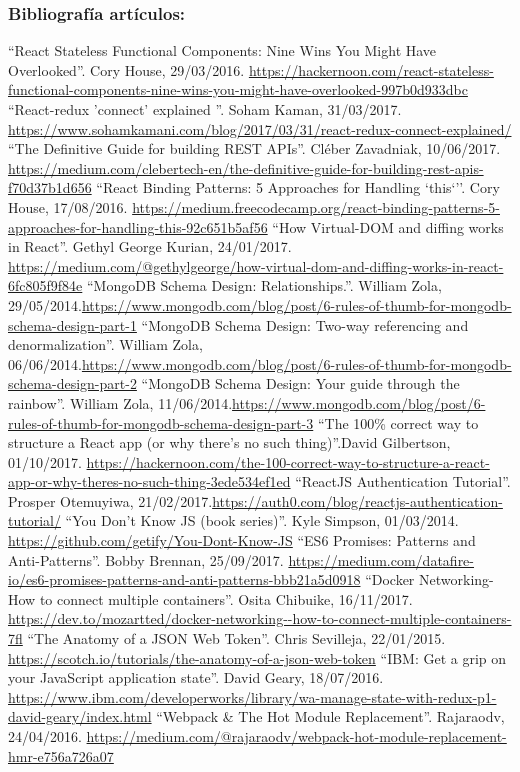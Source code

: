 
\subsubsection*{Bibliografía artículos:}

\bibitem{} ``React Stateless Functional Components: Nine Wins You Might Have Overlooked''. Cory House, 29/03/2016. \url{https://hackernoon.com/react-stateless-functional-components-nine-wins-you-might-have-overlooked-997b0d933dbc}
\bibitem{} ``React-redux 'connect' explained ''. Soham Kaman, 31/03/2017. \url{https://www.sohamkamani.com/blog/2017/03/31/react-redux-connect-explained/}
\bibitem{} ``The Definitive Guide for building REST APIs''. Cléber Zavadniak, 10/06/2017. \url{https://medium.com/clebertech-en/the-definitive-guide-for-building-rest-apis-f70d37b1d656}
\bibitem{} ``React Binding Patterns: 5 Approaches for Handling `this`''. Cory House, 17/08/2016. \url{https://medium.freecodecamp.org/react-binding-patterns-5-approaches-for-handling-this-92c651b5af56}
\bibitem{} ``How Virtual-DOM and diffing works in React''. Gethyl George Kurian, 24/01/2017. \url{https://medium.com/@gethylgeorge/how-virtual-dom-and-diffing-works-in-react-6fc805f9f84e}
\bibitem{} ``MongoDB Schema Design: Relationships.''. 	William Zola, 29/05/2014.\url{https://www.mongodb.com/blog/post/6-rules-of-thumb-for-mongodb-schema-design-part-1}
\bibitem{} ``MongoDB Schema Design: Two-way referencing and denormalization''. William Zola, 06/06/2014.\url{https://www.mongodb.com/blog/post/6-rules-of-thumb-for-mongodb-schema-design-part-2}
\bibitem{} ``MongoDB Schema Design: Your guide through the rainbow''. William Zola, 11/06/2014.\url{https://www.mongodb.com/blog/post/6-rules-of-thumb-for-mongodb-schema-design-part-3}
\bibitem{} ``The 100\% correct way to structure a React app (or why there’s no such thing)''.David Gilbertson, 01/10/2017. \url{https://hackernoon.com/the-100-correct-way-to-structure-a-react-app-or-why-theres-no-such-thing-3ede534ef1ed}
\bibitem{} ``ReactJS Authentication Tutorial''. Prosper Otemuyiwa, 21/02/2017.\url{https://auth0.com/blog/reactjs-authentication-tutorial/}
\bibitem{} ``You Don't Know JS (book series)''. Kyle Simpson, 01/03/2014. \url{https://github.com/getify/You-Dont-Know-JS}
\bibitem{} ``ES6 Promises: Patterns and Anti-Patterns''. Bobby Brennan, 25/09/2017. \url{https://medium.com/datafire-io/es6-promises-patterns-and-anti-patterns-bbb21a5d0918}
\bibitem{} ``Docker Networking- How to connect multiple containers''. Osita Chibuike, 16/11/2017. \url{https://dev.to/mozartted/docker-networking--how-to-connect-multiple-containers-7fl}
\bibitem{} ``The Anatomy of a JSON Web Token''. Chris Sevilleja, 22/01/2015. \url{https://scotch.io/tutorials/the-anatomy-of-a-json-web-token}
\bibitem{} ``IBM: Get a grip on your JavaScript application state''. David Geary, 18/07/2016. \url{https://www.ibm.com/developerworks/library/wa-manage-state-with-redux-p1-david-geary/index.html}
\bibitem{} ``Webpack & The Hot Module Replacement''. Rajaraodv, 24/04/2016. \url{https://medium.com/@rajaraodv/webpack-hot-module-replacement-hmr-e756a726a07}


